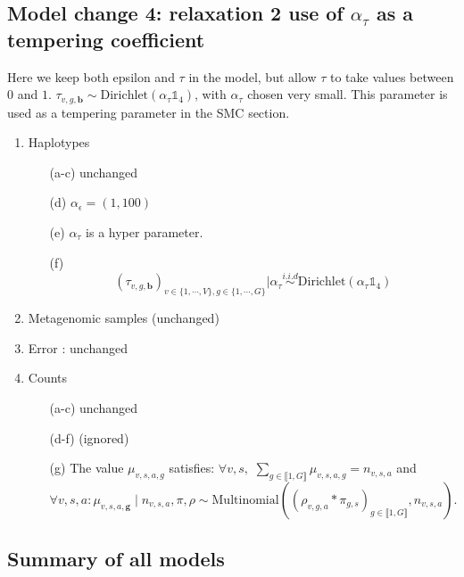 \documentclass{article}
\newcommand\indexvec[1]{\mathbf{#1}}
\begin{document}
\subsection{Model change 4: relaxation 2 use of $\alpha_\tau$ as a tempering coefficient}
Here we keep both epsilon and $\tau$ in the model, but allow $\tau$ to take values between $0$ and $1$. $\tau_{v,g,\indexvec{b}}\sim \mathrm{Dirichlet}(\alpha_\tau\mathds{1}_4)$, with $\alpha_\tau$ chosen very small. This parameter is used as a tempering parameter in the SMC section.

\begin{enumerate}[1.]
    \item Haplotypes
    \begin{enumerate}
    \item[(a-c)] unchanged
    \item[(d)] $\alpha_\epsilon=(1,100)$
    \item[(e)] $\alpha_{\tau}$ is a hyper parameter.
    \item[(f)] $$\left(\tau_{v,g,\indexvec{b}}\right)_{v\in\{1,\cdots,V\},g\in\{1,\cdots,G\}}|\alpha_{\tau}\overset{i.i.d }{\sim}\mathrm{Dirichlet}(\alpha_{\tau}\mathds{1}_4)$$
    
    \end{enumerate}
    \item Metagenomic samples (unchanged)
    \item Error : unchanged
    \item Counts
    \begin{enumerate}

\item[(a-c)] unchanged
    \item [(d-f)] (ignored)
     \item[(g)] The value $\mu_{v,s,a,g}$ satisfies: $\forall v,s,$  $\sum_{g\in\llbracket 1,G\rrbracket}\mu_{v,s,a,g}=n_{v,s,a}$ and
    $$\forall v,s,a : \mu_{v,s,a,\indexvec{g}} \mid n_{v,s,a},\pi, \rho \sim \mathrm{Multinomial}\left(\left(\rho_{v,g,a}*\pi_{g,s}\right)_{g\in\llbracket 1,G\rrbracket},n_{v,s,a}\right).$$
    

\end{enumerate}




\end{enumerate}


\subsection{Summary of all models}
\end{document}

